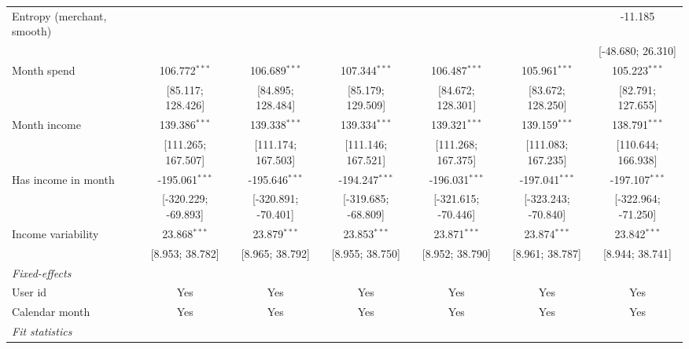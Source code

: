 \begin{table}[htbp]
\begin{threeparttable}[b]
\begin{tabular}{lcccccc}
         Entropy (merchant, smooth) &                     &                     &                     &                     &                     & -11.185\\   
                                    &                     &                     &                     &                     &                     & [-48.680; 26.310]\\   
         Month spend                & 106.772$^{***}$     & 106.689$^{***}$     & 107.344$^{***}$     & 106.487$^{***}$     & 105.961$^{***}$     & 105.223$^{***}$\\   
                                    & [85.117; 128.426]   & [84.895; 128.484]   & [85.179; 129.509]   & [84.672; 128.301]   & [83.672; 128.250]   & [82.791; 127.655]\\   
         Month income               & 139.386$^{***}$     & 139.338$^{***}$     & 139.334$^{***}$     & 139.321$^{***}$     & 139.159$^{***}$     & 138.791$^{***}$\\   
                                    & [111.265; 167.507]  & [111.174; 167.503]  & [111.146; 167.521]  & [111.268; 167.375]  & [111.083; 167.235]  & [110.644; 166.938]\\   
         Has income in month        & -195.061$^{***}$    & -195.646$^{***}$    & -194.247$^{***}$    & -196.031$^{***}$    & -197.041$^{***}$    & -197.107$^{***}$\\   
                                    & [-320.229; -69.893] & [-320.891; -70.401] & [-319.685; -68.809] & [-321.615; -70.446] & [-323.243; -70.840] & [-322.964; -71.250]\\   
         Income variability         & 23.868$^{***}$      & 23.879$^{***}$      & 23.853$^{***}$      & 23.871$^{***}$      & 23.874$^{***}$      & 23.842$^{***}$\\   
                                    & [8.953; 38.782]     & [8.965; 38.792]     & [8.955; 38.750]     & [8.952; 38.790]     & [8.961; 38.787]     & [8.944; 38.741]\\   
         \midrule
         \emph{Fixed-effects}\\
         User id                    & Yes                 & Yes                 & Yes                 & Yes                 & Yes                 & Yes\\  
         Calendar month             & Yes                 & Yes                 & Yes                 & Yes                 & Yes                 & Yes\\  
         \midrule
         \emph{Fit statistics}\\

\end{tabular}
\end{threeparttable}
\end{table}
